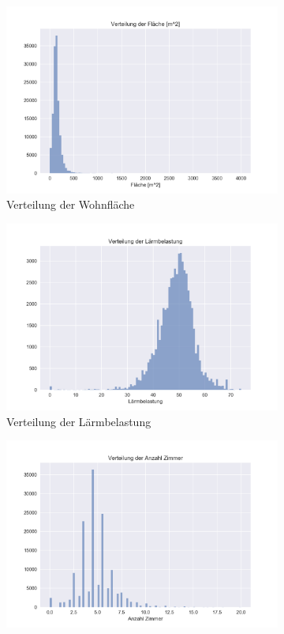 \begin{figure}[h]
\begin{subfigure}{.5\textwidth}
  \centering
  \includegraphics[width=\linewidth]{images/anhang/analysis/Verteilung_living_area.png}
  \caption{Verteilung der Wohnfläche}
\end{subfigure}
\begin{subfigure}{.5\textwidth}
  \centering
  \includegraphics[width=\linewidth]{images/anhang/analysis/Verteilung_noise_level.png}
  \caption{Verteilung der Lärmbelastung} 
\end{subfigure}
\begin{subfigure}{.5\textwidth}
  \centering
  \includegraphics[width=\linewidth]{images/anhang/analysis/Verteilung_num_rooms.png}

\end{subfigure}
\end{figure}
